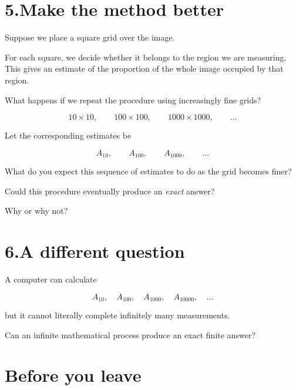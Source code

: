 \documentclass[11pt]{article}
\begin{document}
\section*{5.\quad Make the method better}

Suppose we place a square grid over the image.

For each square, we decide whether it belongs to the region we
are measuring. This gives an estimate of the proportion of the
whole image occupied by that region.

What happens if we repeat the procedure using increasingly fine grids?

\[
10\times10,
\qquad
100\times100,
\qquad
1000\times1000,
\qquad
\ldots
\]

Let the corresponding estimates be

\[
A_{10},
\qquad
A_{100},
\qquad
A_{1000},
\qquad
\ldots
\]

\begin{problem}
What do you expect this sequence of estimates to do as the grid
becomes finer?

\vspace{1.0in}
\end{problem}

\begin{problem}
Could this procedure eventually produce an \emph{exact} answer?

Why or why not?

\vspace{1.0in}
\end{problem}

\section*{6.\quad A different question}

A computer can calculate

\[
A_{10},
\quad
A_{100},
\quad
A_{1000},
\quad
A_{10000},
\quad \ldots
\]

but it cannot literally complete infinitely many measurements.

\begin{keyidea}
\centering
Can an infinite mathematical process produce an exact finite answer?
\end{keyidea}

\vspace{1em}

\section*{Before you leave}
\end{document}
